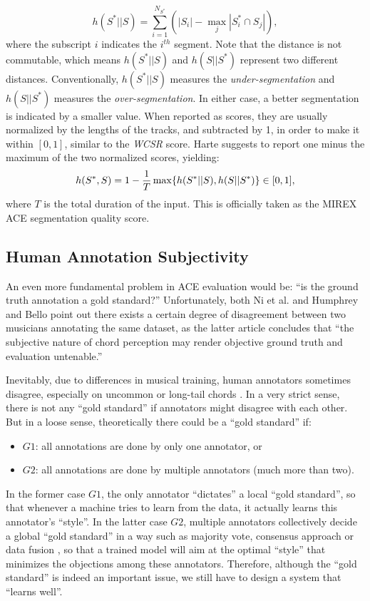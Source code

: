 \begin{equation}
h(S^*||S) = \sum_{i=1}^{N_{S^*}}(|S_i|-\max_j|S_i^* \cap S_j|),
\end{equation}
where the subscript $i$ indicates the $i^{th}$ segment. Note that the distance is not commutable, which means $h(S^*||S)$ and $h(S||S^*)$ represent two different distances. Conventionally, $h(S^*||S)$ measures the {\it under-segmentation} and $h(S||S^*)$ measures the {\it over-segmentation}. In either case, a better segmentation is indicated by a smaller value. When reported as scores, they are usually normalized by the lengths of the tracks, and subtracted by 1, in order to make it within $[0,1]$, similar to the \textit{WCSR} score. Harte \cite{harte2010towards} suggests to report one minus the maximum of the two normalized scores, yielding:
\begin{equation}
h(S^*,S)=1-{1\over T}\max\{h(S^*||S), h(S||S^*)\} \in [0,1],
\end{equation}
where $T$ is the total duration of the input. This is officially taken as the MIREX ACE segmentation quality score.

\subsection{Human Annotation Subjectivity} \label{sec:2-subjectivity}
An even more fundamental problem in ACE evaluation would be: ``is the ground truth annotation a gold standard?'' Unfortunately, both Ni et al. \cite{ni2013understanding} and Humphrey and Bello \cite{humphreyfour} point out there exists a certain degree of disagreement between two musicians annotating the same dataset, as the latter article concludes that ``the subjective nature of chord perception may render objective ground truth and evaluation untenable.''

Inevitably, due to differences in musical training, human annotators sometimes disagree, especially on uncommon or long-tail chords \cite{humphreyfour}. In a very strict sense, there is not any ``gold standard'' if annotators might disagree with each other. But in a loose sense, theoretically there could be a ``gold standard'' if:
\begin{itemize}
\item $G1$: all annotations are done by only one annotator, or
\item $G2$: all annotations are done by multiple annotators (much more than two).
\end{itemize}
In the former case $G1$, the only annotator ``dictates'' a local ``gold standard'', so that whenever a machine tries to learn from the data, it actually learns this annotator's ``style''. In the latter case $G2$, multiple annotators collectively decide a global ``gold standard'' in a way such as majority vote, consensus approach \cite{ni2013understanding} or data fusion \cite{koopsintegration,klein2004sensor}, so that a trained model will aim at the optimal ``style'' that minimizes the objections among these annotators. Therefore, although the ``gold standard'' is indeed an important issue, we still have to design a system that ``learns well''.

